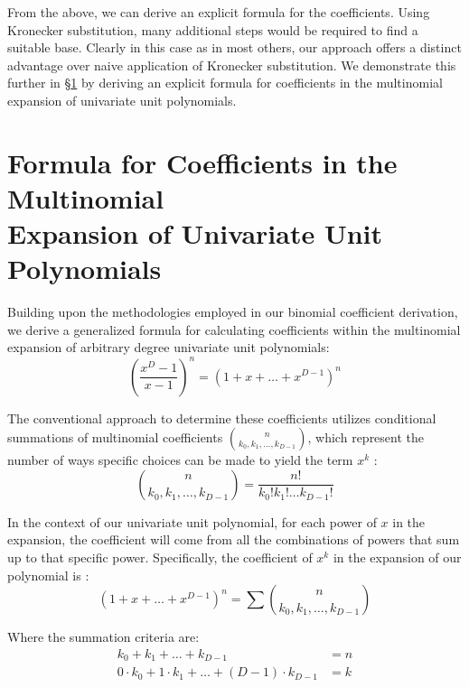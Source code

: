 \documentclass{article}
\theoremstyle{plain}
\theoremstyle{definition}
\begin{document}
From the above, we can derive an explicit formula for the coefficients. Using Kronecker substitution, many additional steps would be required to find a suitable base. Clearly in this case as in most others, our approach offers a distinct advantage over naive application of Kronecker substitution. We demonstrate this further in \S \ref{sec:multinomialformula} by deriving an explicit formula for coefficients in the multinomial expansion of univariate unit polynomials.

\section[Formula for Coefficients in the Multinomial Expansion of Univariate Unit Polynomials]{Formula for Coefficients in the Multinomial\\ Expansion of Univariate Unit Polynomials}
\label{sec:multinomialformula}
Building upon the methodologies employed in our binomial coefficient derivation, we derive a generalized formula for calculating coefficients within the multinomial expansion of arbitrary degree univariate unit polynomials:
\begin{equation}
    \left(\frac{x^{D}-1}{x-1}\right)^n = (1 + x + \ldots + x^{D-1})^n 
\end{equation}

The conventional approach to determine these coefficients utilizes conditional summations of multinomial coefficients \(\binom{n}{k_0, k_1, \ldots, k_{D-1}}\), which represent the number of ways specific choices can be made to yield the term \(x^k\) \cite{graham1994concrete}:
\begin{equation}
    \binom{n}{k_0, k_1, \ldots, k_{D-1}} = \frac{n!}{k_0! k_1! \ldots k_{D-1}!}
\end{equation}

In the context of our univariate unit polynomial, for each power of \(x\) in the expansion, the coefficient will come from all the combinations of powers that sum up to that specific power. Specifically, the coefficient of \(x^k\) in the expansion of our polynomial is \cite{brualdi2010intro}:
\begin{equation}
    [x^k](1 + x + \ldots + x^{D-1})^n = \sum \binom{n}{k_0, k_1, \ldots, k_{D-1}}
\end{equation}

Where the summation criteria are:
\begin{align}
    k_0 + k_1 + \ldots + k_{D-1} &= n \\
    0 \cdot k_0 + 1 \cdot k_1 + \ldots + (D-1) \cdot k_{D-1} &= k
\end{align}
\end{document}
